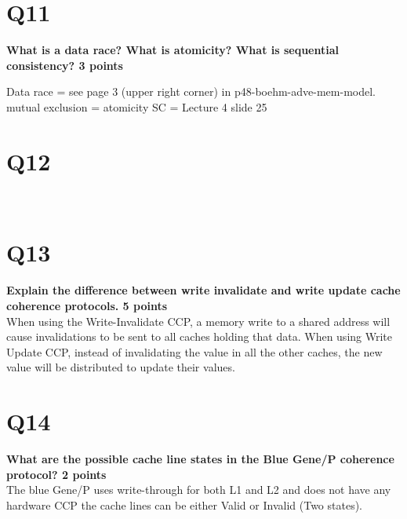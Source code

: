 \documentclass[a4paper]{article}
\begin{document}
\section*{Q11}
\large{\textbf{
What is a data race? What is atomicity? What is sequential consistency? 3 points\\}}

Data race = see page 3 (upper right corner) in p48-boehm-adve-mem-model.
mutual exclusion = atomicity
SC = Lecture 4 slide 25

\section*{Q12}
\large{\textbf{
\\}}

\section*{Q13}
\large{\textbf{
Explain the difference between write invalidate and write update cache coherence protocols. 5 points\\}}
When using the Write-Invalidate CCP, a memory write to a shared address will cause invalidations to be sent to all caches holding that data. When using Write Update CCP, instead of invalidating the value in all the other caches, the new value will be distributed to update their values.

\section*{Q14}
\large{\textbf{
What are the possible cache line states in the Blue Gene/P coherence protocol? 2 points\\}}
The blue Gene/P uses write-through for both L1 and L2 and does not have any hardware CCP the cache lines can be either Valid or Invalid (Two states).
\end{document}
